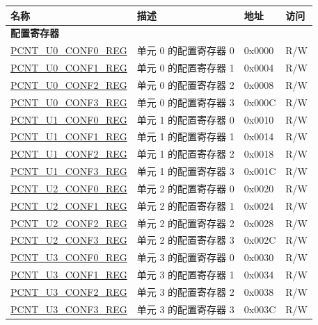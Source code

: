 \begin{longtable}{ | p{6cm} | p{7.2cm} | p{1.3cm} | p{1cm} | }
    \hline\rowcolor{lightgray}
    \textbf{名称} & \textbf{描述} &  \textbf{地址} & \textbf{访问} \\ \hline
    \endhead
    \multicolumn{4}{|l|}{\textbf{配置寄存器}} \\ \hline
    \hyperref[regdesc:PCNTUNCONF0REG]{PCNT\_U0\_CONF0\_REG} & 单元 0 的配置寄存器 0 & 0x0000 & R/W \\ \hline
    \hyperref[regdesc:PCNTUNCONF1REG]{PCNT\_U0\_CONF1\_REG} & 单元 0 的配置寄存器 1 & 0x0004 & R/W \\ \hline
    \hyperref[regdesc:PCNTUNCONF2REG]{PCNT\_U0\_CONF2\_REG} & 单元 0 的配置寄存器 2 & 0x0008 & R/W \\ \hline
    \hyperref[regdesc:PCNTUNCONF3REG]{PCNT\_U0\_CONF3\_REG} & 单元 0 的配置寄存器 3 & 0x000C & R/W \\ \hline
    \hyperref[regdesc:PCNTUNCONF0REG]{PCNT\_U1\_CONF0\_REG} & 单元 1 的配置寄存器 0 & 0x0010 & R/W \\ \hline
    \hyperref[regdesc:PCNTUNCONF1REG]{PCNT\_U1\_CONF1\_REG} & 单元 1 的配置寄存器 1 & 0x0014 & R/W \\ \hline
    \hyperref[regdesc:PCNTUNCONF2REG]{PCNT\_U1\_CONF2\_REG} & 单元 1 的配置寄存器 2 & 0x0018 & R/W \\ \hline
    \hyperref[regdesc:PCNTUNCONF3REG]{PCNT\_U1\_CONF3\_REG} & 单元 1 的配置寄存器 3 & 0x001C & R/W \\ \hline
    \hyperref[regdesc:PCNTUNCONF0REG]{PCNT\_U2\_CONF0\_REG} & 单元 2 的配置寄存器 0 & 0x0020 & R/W \\ \hline
    \hyperref[regdesc:PCNTUNCONF1REG]{PCNT\_U2\_CONF1\_REG} & 单元 2 的配置寄存器 1 & 0x0024 & R/W \\ \hline
    \hyperref[regdesc:PCNTUNCONF2REG]{PCNT\_U2\_CONF2\_REG} & 单元 2 的配置寄存器 2 & 0x0028 & R/W \\ \hline
    \hyperref[regdesc:PCNTUNCONF3REG]{PCNT\_U2\_CONF3\_REG} & 单元 2 的配置寄存器 3 & 0x002C & R/W \\ \hline
    \hyperref[regdesc:PCNTUNCONF0REG]{PCNT\_U3\_CONF0\_REG} & 单元 3 的配置寄存器 0 & 0x0030 & R/W \\ \hline
    \hyperref[regdesc:PCNTUNCONF1REG]{PCNT\_U3\_CONF1\_REG} & 单元 3 的配置寄存器 1 & 0x0034 & R/W \\ \hline
    \hyperref[regdesc:PCNTUNCONF2REG]{PCNT\_U3\_CONF2\_REG} & 单元 3 的配置寄存器 2 & 0x0038 & R/W \\ \hline
    \hyperref[regdesc:PCNTUNCONF3REG]{PCNT\_U3\_CONF3\_REG} & 单元 3 的配置寄存器 3 & 0x003C & R/W \\ \hline

\end{longtable}
